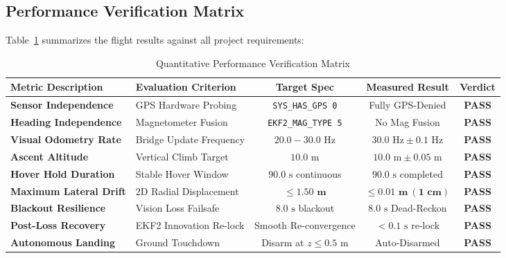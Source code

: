 \documentclass[11pt,a4paper]{article}
\begin{document}
\subsection{Performance Verification Matrix}
Table~\ref{tab:results} summarizes the flight results against all project requirements:

\begin{table}[h!]
\centering
\small
\begin{tabularx}{\textwidth}{l X c c c}
\toprule
\textbf{Metric Description} & \textbf{Evaluation Criterion} & \textbf{Target Spec} & \textbf{Measured Result} & \textbf{Verdict} \\
\midrule
\textbf{Sensor Independence} & GPS Hardware Probing & \texttt{SYS\_HAS\_GPS 0} & Fully GPS-Denied & \textbf{PASS} \\
\textbf{Heading Independence} & Magnetometer Fusion & \texttt{EKF2\_MAG\_TYPE 5} & No Mag Fusion & \textbf{PASS} \\
\textbf{Visual Odometry Rate} & Bridge Update Frequency & $20.0 - 30.0\text{ Hz}$ & $30.0\text{ Hz} \pm 0.1\text{ Hz}$ & \textbf{PASS} \\
\textbf{Ascent Altitude} & Vertical Climb Target & $10.0\text{ m}$ & $10.0\text{ m} \pm 0.05\text{ m}$ & \textbf{PASS} \\
\textbf{Hover Hold Duration} & Stable Hover Window & $90.0\text{ s}$ continuous & $90.0\text{ s}$ completed & \textbf{PASS} \\
\textbf{Maximum Lateral Drift} & 2D Radial Displacement & $\mathbf{\le 1.50\text{ m}}$ & $\mathbf{\le 0.01\text{ m}\ (1\text{ cm})}$ & \textbf{PASS} \\
\textbf{Blackout Resilience} & Vision Loss Failsafe & $8.0\text{ s}$ blackout & $8.0\text{ s}$ Dead-Reckon & \textbf{PASS} \\
\textbf{Post-Loss Recovery} & EKF2 Innovation Re-lock & Smooth Re-convergence & $<0.1\text{ s}$ re-lock & \textbf{PASS} \\
\textbf{Autonomous Landing} & Ground Touchdown & Disarm at $z \le 0.5\text{ m}$ & Auto-Disarmed & \textbf{PASS} \\
\bottomrule
\end{tabularx}
\caption{Quantitative Performance Verification Matrix}
\label{tab:results}
\end{table}

\end{document}
